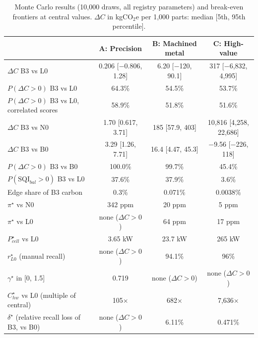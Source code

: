 \begin{table}[!t]
\centering
\footnotesize
\caption{Monte Carlo results (10{,}000 draws, all registry parameters) and break-even frontiers at central values. $\Delta C$ in kgCO$_2$e per 1{,}000 parts: median [5th, 95th percentile].}
\label{tab:uncertainty}
\setlength{\tabcolsep}{8pt}
\begin{tabular}{@{}lccc@{}}
\toprule
 & A: Precision & B: Machined metal & C: High-value \\
\midrule
$\Delta C$ B3 vs L0 & 0.206 [$-$0.806, 1.28] & 6.20 [$-$120, 90.1] & 317 [$-$6{,}832, 4{,}995] \\
$P(\Delta C>0)$ B3 vs L0 & 64.3\% & 54.5\% & 53.7\% \\
$P(\Delta C>0)$ B3 vs L0, correlated scores & 58.9\% & 51.8\% & 51.6\% \\
$\Delta C$ B3 vs N0 & 1.70 [0.617, 3.71] & 185 [57.9, 403] & 10{,}816 [4{,}258, 22{,}686] \\
$\Delta C$ B3 vs B0 & 3.29 [1.26, 7.71] & 16.4 [4.47, 45.3] & $-$9.56 [$-$226, 118] \\
$P(\Delta C>0)$ B3 vs B0 & 100.0\% & 99.7\% & 45.4\% \\
$P(\mathrm{SQI}_{bal}>0)$ B3 vs L0 & 37.6\% & 37.9\% & 3.6\% \\
Edge share of B3 carbon & 0.3\% & 0.071\% & 0.0038\% \\
\midrule
$\pi^\star$ vs N0 & 342 ppm & 20 ppm & 5 ppm \\
$\pi^\star$ vs L0 & none ($\Delta C>0$) & 64 ppm & 17 ppm \\
$P^\star_{cell}$ vs L0 & 3.65 kW & 23.7 kW & 265 kW \\
$r^\star_{L0}$ (manual recall) & none ($\Delta C>0$) & 94.1\% & 96\% \\
$\gamma^\star$ in [0, 1.5] & 0.719 & none ($\Delta C>0$) & none ($\Delta C>0$) \\
$C_{hw}^\star$ vs L0 (multiple of central) & 105$\times$ & 682$\times$ & 7{,}636$\times$ \\
$\delta^\star$ (relative recall loss of B3, vs B0) & none ($\Delta C>0$) & 6.11\% & 0.471\% \\
\bottomrule
\end{tabular}
\end{table}
